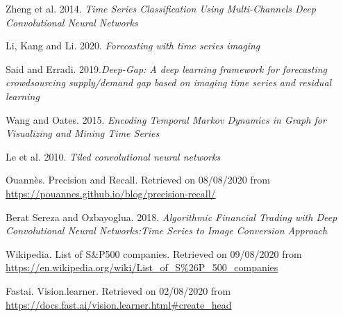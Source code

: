 \documentclass[11pt]{article}
\begin{document}
\begin{onehalfspace}
\begin{thebibliography}{9}
    Zheng et al. 2014. \textit{Time Series Classification Using Multi-Channels Deep Convolutional Neural Networks}

    Li, Kang and Li. 2020. \textit{Forecasting with time series imaging}

    Said and Erradi. 2019.\textit{Deep-Gap: A deep learning framework for forecasting crowdsourcing supply/demand  gap  based  on  imaging  time  series  and  residual  learning}

    Wang and Oates. 2015. \textit{Encoding Temporal Markov Dynamics in Graph for Visualizing and Mining Time Series}

    Le et al. 2010. \textit{Tiled convolutional neural networks}

    Ouannès. Precision and Recall. Retrieved on 08/08/2020 from \url{https://pouannes.github.io/blog/precision-recall/}

    Berat Sereza and Ozbayoglua. 2018. \textit{Algorithmic Financial Trading with Deep Convolutional Neural Networks:Time Series to Image Conversion Approach}

    Wikipedia. List of S\&P500 companies. Retrieved on 09/08/2020 from \url{https://en.wikipedia.org/wiki/List_of_S%26P_500_companies}

    Fastai. Vision.learner. Retrieved on 02/08/2020 from \url{https://docs.fast.ai/vision.learner.html#create_head}

\end{thebibliography}

\end{onehalfspace}
\end{document}
